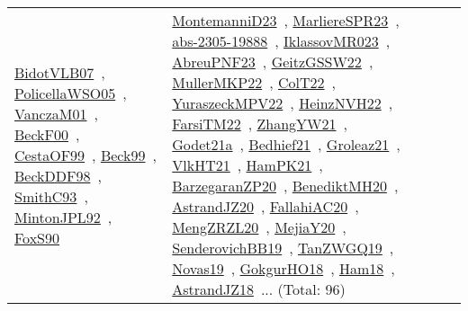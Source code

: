 {\begin{longtable}{lp{3cm}>{\raggedright\arraybackslash}p{6cm}>{\raggedright\arraybackslash}p{6cm}>{\raggedright\arraybackslash}p{8cm}}
\href{../works/BidotVLB07.pdf}{BidotVLB07}~\cite{BidotVLB07}, \href{../works/PolicellaWSO05.pdf}{PolicellaWSO05}~\cite{PolicellaWSO05}, \href{../works/VanczaM01.pdf}{VanczaM01}~\cite{VanczaM01}, \href{../works/BeckF00.pdf}{BeckF00}~\cite{BeckF00}, \href{../works/CestaOF99.pdf}{CestaOF99}~\cite{CestaOF99}, \href{../works/Beck99.pdf}{Beck99}~\cite{Beck99}, \href{../works/BeckDDF98.pdf}{BeckDDF98}~\cite{BeckDDF98}, \href{../works/SmithC93.pdf}{SmithC93}~\cite{SmithC93}, \href{../works/MintonJPL92.pdf}{MintonJPL92}~\cite{MintonJPL92}, \href{../works/FoxS90.pdf}{FoxS90}~\cite{FoxS90} & \href{../works/MontemanniD23.pdf}{MontemanniD23}~\cite{MontemanniD23}, \href{../works/MarliereSPR23.pdf}{MarliereSPR23}~\cite{MarliereSPR23}, \href{../works/abs-2305-19888.pdf}{abs-2305-19888}~\cite{abs-2305-19888}, \href{../works/IklassovMR023.pdf}{IklassovMR023}~\cite{IklassovMR023}, \href{../works/AbreuPNF23.pdf}{AbreuPNF23}~\cite{AbreuPNF23}, \href{../works/GeitzGSSW22.pdf}{GeitzGSSW22}~\cite{GeitzGSSW22}, \href{../works/MullerMKP22.pdf}{MullerMKP22}~\cite{MullerMKP22}, \href{../works/ColT22.pdf}{ColT22}~\cite{ColT22}, \href{../works/YuraszeckMPV22.pdf}{YuraszeckMPV22}~\cite{YuraszeckMPV22}, \href{../works/HeinzNVH22.pdf}{HeinzNVH22}~\cite{HeinzNVH22}, \href{../works/FarsiTM22.pdf}{FarsiTM22}~\cite{FarsiTM22}, \href{../works/ZhangYW21.pdf}{ZhangYW21}~\cite{ZhangYW21}, \href{../works/Godet21a.pdf}{Godet21a}~\cite{Godet21a}, \href{../works/Bedhief21.pdf}{Bedhief21}~\cite{Bedhief21}, \href{../works/Groleaz21.pdf}{Groleaz21}~\cite{Groleaz21}, \href{../works/VlkHT21.pdf}{VlkHT21}~\cite{VlkHT21}, \href{../works/HamPK21.pdf}{HamPK21}~\cite{HamPK21}, \href{../works/BarzegaranZP20.pdf}{BarzegaranZP20}~\cite{BarzegaranZP20}, \href{../works/BenediktMH20.pdf}{BenediktMH20}~\cite{BenediktMH20}, \href{../works/AstrandJZ20.pdf}{AstrandJZ20}~\cite{AstrandJZ20}, \href{../works/FallahiAC20.pdf}{FallahiAC20}~\cite{FallahiAC20}, \href{../works/MengZRZL20.pdf}{MengZRZL20}~\cite{MengZRZL20}, \href{../works/MejiaY20.pdf}{MejiaY20}~\cite{MejiaY20}, \href{../works/SenderovichBB19.pdf}{SenderovichBB19}~\cite{SenderovichBB19}, \href{../works/TanZWGQ19.pdf}{TanZWGQ19}~\cite{TanZWGQ19}, \href{../works/Novas19.pdf}{Novas19}~\cite{Novas19}, \href{../works/GokgurHO18.pdf}{GokgurHO18}~\cite{GokgurHO18}, \href{../works/Ham18.pdf}{Ham18}~\cite{Ham18}, \href{../works/AstrandJZ18.pdf}{AstrandJZ18}~\cite{AstrandJZ18}... (Total: 96)\\

\end{longtable}}
